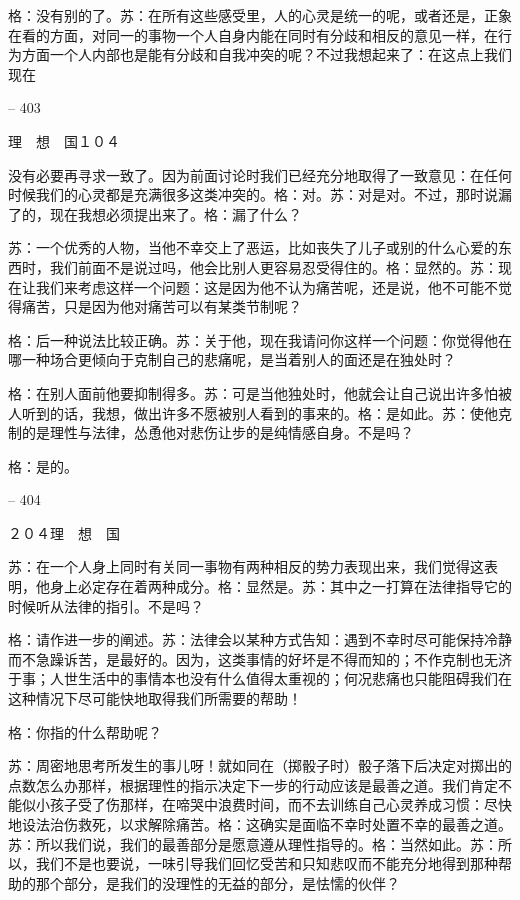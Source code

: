 \documentclass[11pt,oneside]{book}
\begin{document}
\begin{common-format}
    格：没有别的了。苏：在所有这些感受里，人的心灵是统一的呢，或者还是，正象在看的方面，对同一的事物一个人自身内能在同时有分歧和相反的意见一样，在行为方面一个人内部也是能有分歧和自我冲突的呢？不过我想起来了：在这点上我们现在

    

-- 403

    理　想　国１０４

    没有必要再寻求一致了。因为前面讨论时我们已经充分地取得了一致意见：在任何时候我们的心灵都是充满很多这类冲突的。格：对。苏：对是对。不过，那时说漏了的，现在我想必须提出来了。格：漏了什么？

    苏：一个优秀的人物，当他不幸交上了恶运，比如丧失了儿子或别的什么心爱的东西时，我们前面不是说过吗，他会比别人更容易忍受得住的。格：显然的。苏：现在让我们来考虑这样一个问题：这是因为他不认为痛苦呢，还是说，他不可能不觉得痛苦，只是因为他对痛苦可以有某类节制呢？

    格：后一种说法比较正确。苏：关于他，现在我请问你这样一个问题：你觉得他在哪一种场合更倾向于克制自己的悲痛呢，是当着别人的面还是在独处时？

    格：在别人面前他要抑制得多。苏：可是当他独处时，他就会让自己说出许多怕被人听到的话，我想，做出许多不愿被别人看到的事来的。格：是如此。苏：使他克制的是理性与法律，怂恿他对悲伤让步的是纯情感自身。不是吗？

    格：是的。

    

-- 404

    ２０４理　想　国

    苏：在一个人身上同时有关同一事物有两种相反的势力表现出来，我们觉得这表明，他身上必定存在着两种成分。格：显然是。苏：其中之一打算在法律指导它的时候听从法律的指引。不是吗？

    格：请作进一步的阐述。苏：法律会以某种方式告知：遇到不幸时尽可能保持冷静而不急躁诉苦，是最好的。因为，这类事情的好坏是不得而知的；不作克制也无济于事；人世生活中的事情本也没有什么值得太重视的；何况悲痛也只能阻碍我们在这种情况下尽可能快地取得我们所需要的帮助！

    格：你指的什么帮助呢？

    苏：周密地思考所发生的事儿呀！就如同在（掷骰子时）骰子落下后决定对掷出的点数怎么办那样，根据理性的指示决定下一步的行动应该是最善之道。我们肯定不能似小孩子受了伤那样，在啼哭中浪费时间，而不去训练自己心灵养成习惯：尽快地设法治伤救死，以求解除痛苦。格：这确实是面临不幸时处置不幸的最善之道。苏：所以我们说，我们的最善部分是愿意遵从理性指导的。格：当然如此。苏：所以，我们不是也要说，一味引导我们回忆受苦和只知悲叹而不能充分地得到那种帮助的那个部分，是我们的没理性的无益的部分，是怯懦的伙伴？


\end{common-format}
\end{document}
